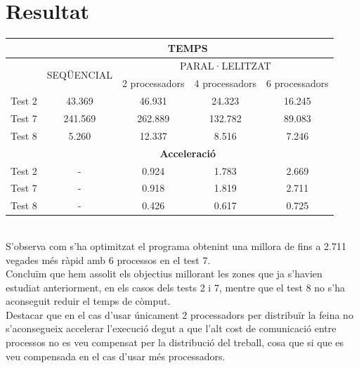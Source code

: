 \documentclass[a4paper, 11pt]{article}
\begin{document}
\section{Resultat}\label{TaulaResultats}
\begin{table}[h]
  \centering
  \begin{tabular}{l||c||c|c|c}
        \multirow{3}{*}{\cellcolor{black}{}} & \multicolumn{4}{c}{\textbf{TEMPS}}\\\hline
        \cellcolor{black}{} & \multirow{2}{*}{SEQÜENCIAL} & \multicolumn{3}{c}{PARAL·LELITZAT}\\ 
        \cellcolor{black}{} &  & 2 processadors & 4 processadors & 6 processadors \\\hline\hline
        Test 2 & 43.369 & 46.931 & 24.323 & 16.245 \\\hline
        Test 7 & 241.569 & 262.889 & 132.782 & 89.083 \\\hline
        Test 8 & 5.260 & 12.337 & 8.516 & 7.246 \\\hline\hline
        \cellcolor{black}{} & \multicolumn{4}{c}{\textbf{Acceleració}} \\\hline\hline
        Test 2 & - & 0.924 & 1.783 & 2.669 \\\hline
        Test 7 & - & 0.918 & 1.819 & 2.711 \\\hline
        Test 8 & - & 0.426 & 0.617 & 0.725 \\
    \end{tabular}
\end{table}
\hspace{-1.5 em}\\S'observa com s'ha optimitzat el programa obtenint una millora de fins a 2.711 vegades més ràpid amb 6 processos en el test 7.\\
Concluïm que hem assolit els objectius millorant les zones que ja s'havien estudiat anteriorment, en els casos dels tests 2 i 7, mentre que el test 8 no s'ha aconseguit reduir el temps de còmput.\\
Destacar que en el cas d'usar únicament 2 processadors per distribuïr la feina no s'aconsegueix accelerar l'execució degut a que l'alt cost de comunicació entre processos no es veu compensat per la distribució del treball, cosa que si que es veu compensada en el cas d'usar més processadors.
\newpage
\end{document}
